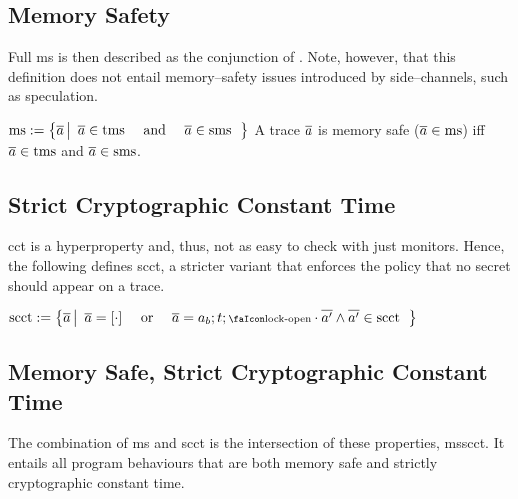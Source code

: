 \documentclass[utf8,acmsmall,review,screen,dvipsnames]{acmart}
\begin{document}
\subsection{Memory Safety}

Full \gls{ms} is then described as the conjunction of .
Note, however, that this definition does not entail memory--safety issues introduced by side--channels, such as speculation.

\begin{definition}[\glsfirst{ms}]\label{def:trace:msdef}
  $
  \operatorname{ms}:=\left\{\overline{a} \left|\begin{array}{rcl}
                                 \overline{a}\in\operatorname{tms} & \text{ and } & \overline{a}\in\operatorname{sms}
                               \end{array}\right.\right\}
  $
  A trace $\overline{a}$ is memory safe ($\overline{a}\in\operatorname{ms}$) iff $\overline{a}\in\operatorname{tms}$ and $\overline{a}\in\operatorname{sms}$.
\end{definition}


\subsection{Strict Cryptographic Constant Time}

\gls{cct} is a hyperproperty and, thus, not as easy to check with just monitors. %
Hence, the following defines \gls{scct}, a stricter variant that enforces the policy that no secret should appear on a trace.

\begin{definition}\label{def:trace:scctdef}
  $
  \scctsafe:=\left\{\trace \left|\begin{array}{rcl}
                                   \trace=\hole{\cdot} & \text{ or } & \trace=\event[_{b}];\sandboxtag;\unlock\cdot\trace['] \wedge \trace[']\in\scctsafe
                                 \end{array}\right.\right\}
  $
\end{definition}

\subsection{Memory Safe, Strict Cryptographic Constant Time}

The combination of \gls{ms} and \gls{scct} is the intersection of these properties, \gls{msscct}.
It entails all program behaviours that are both memory safe and strictly cryptographic constant time.
\end{document}
